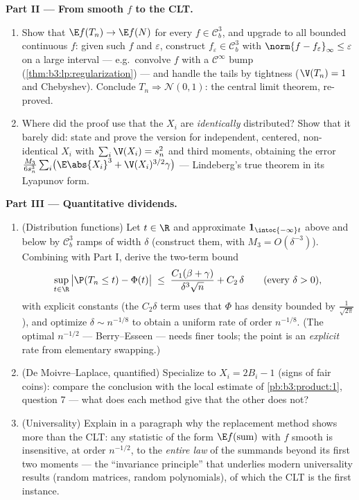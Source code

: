 \begin{problem}
\medskip
\noindent\textbf{Part II --- From smooth $f$ to the CLT.}
\begin{enumerate}[resume]
  \item Show that $\E f(T_n) \to \E f(N)$ for every $f \in
        \mathcal C_b^3$, and upgrade to all bounded
        continuous $f$: given such $f$ and $\varepsilon$,
        construct $f_\varepsilon \in \mathcal C^3_b$ with
        $\norm{f - f_\varepsilon}_\infty \leq \varepsilon$
        on a large interval --- e.g.\ convolve $f$ with a
        $\mathcal C^\infty$ bump
        (\cref{thm:b3:lp:regularization}) --- and handle the
        tails by tightness ($\V(T_n) = 1$ and Chebyshev).
        Conclude $T_n \Rightarrow \mathcal N(0, 1)$: the
        central limit theorem, re-proved.
  \item Where did the proof use that the $X_i$ are
        \emph{identically} distributed? Show that it barely
        did: state and prove the version for independent,
        centered, non-identical $X_i$ with
        $\sum_i\V(X_i) = s_n^2$ and third moments, obtaining
        the error $\frac{M_3}{6s_n^3}\sum_i\bigl(\E\abs{X_i}^3
        + \V(X_i)^{3/2}\gamma\bigr)$ --- Lindeberg's true
        theorem in its Lyapunov form.
\end{enumerate}

\medskip
\noindent\textbf{Part III --- Quantitative dividends.}
\begin{enumerate}[resume]
  \item (Distribution functions) Let $t \in \R$ and
        approximate $\mathbf 1_{\intoc{-\infty}t}$ above and
        below by $\mathcal C^3_b$ ramps of width $\delta$
        (construct them, with $M_3 = O(\delta^{-3})$).
        Combining with Part I, derive the two-term bound
        \[
        \sup_{t\in\R}\,\bigl|\P(T_n \leq t) -
        \Phi(t)\bigr| \;\leq\;
        \frac{C_1(\beta + \gamma)}{\delta^3\sqrt n} +
        C_2\,\delta
        \qquad (\text{every } \delta > 0),
        \]
        with explicit constants (the $C_2\delta$ term uses
        that $\Phi$ has density bounded by
        $\frac1{\sqrt{2\pi}}$), and optimize $\delta \sim
        n^{-1/8}$ to obtain a uniform rate of order
        $n^{-1/8}$.
        (The optimal $n^{-1/2}$ --- Berry--Esseen ---
        needs finer tools; the point is an \emph{explicit}
        rate from elementary swapping.)
  \item (De Moivre--Laplace, quantified) Specialize to
        $X_i = 2B_i - 1$ (signs of fair coins): compare the
        conclusion with the local estimate of
        \cref{pb:b3:product:1}, question 7 --- what does
        each method give that the other does not?
  \item (Universality) Explain in a paragraph why the
        replacement method shows more than the CLT: any
        statistic of the form $\E f(\text{sum})$ with $f$
        smooth is insensitive, at order $n^{-1/2}$, to the
        \emph{entire law} of the summands beyond its first
        two moments --- the ``invariance principle'' that
        underlies modern universality results (random
        matrices, random polynomials), of which the CLT is
        the first instance.
\end{enumerate}
\end{problem}

